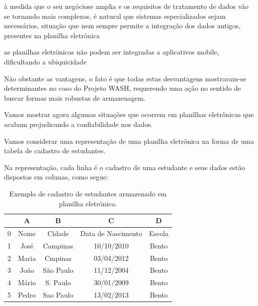 \documentclass[
12pt,		%
openright,	%
twoside,  %
a4paper,			%
chapter=TITLE,		%
english,			%
french,				%
spanish,			%
brazil				%
]{USPSC-classe/USPSC_RedarTex}
\begin{document}
\begin{alineas}
\item \`a medida que o seu \textquotedbl neg\'ocio\textquotedbl  se amplia e os requisitos de tratamento de dados v\~ao se tornando mais complexos, \'e natural que sistemas especializados sejam necess\'arios, situa\c{c}\~ao que nem sempre permite a integra\c{c}\~ao dos dados antigos, presentes na planilha eletr\^onica
\item as planilhas eletr\^onicas n\~ao podem ser integradas a aplicativos mobile, dificultando a ubiquicidade
\end{alineas}

N\~ao obstante as vantagens, o fato \'e que todas estas desvantagens mostraram-se determinantes no caso do Projeto WASH, requerendo uma a\c{c}\~ao no sentido de buscar formas mais robustas de armazenagem.










Vamos mostrar agora algumas situa\c{c}\~oes que ocorrem em planilhas eletr\^onicas que acabam prejudicando a confiabilidade nos dados.










Vamos considerar uma representa\c{c}\~ao de uma planilha eletr\^onica na forma de uma tabela de cadastro de estudantes.










Na representa\c{c}\~ao, cada linha \'e o cadastro de uma estudante e seus dados est\~ao dispostos em colunas, como segue:














\begin{table}[htb]
\tiny
\caption{\label{bb41d21eda68eb2f2098ab6a40e472b036dd488c}Exemplo de cadastro de estudantes armazenado em planilha eletr\^onica.}

\centering
\begin{tabular}{|c|c|c|c|c|}
\hline
  &  A  &  B  &  C  &  D  \\
\hline
0 & Nome  &  Cidade  &  Data de Nascimento  &  Escola \\
1 & Jos\'e  &  Campinas  &  10/10/2010  &  Bento \\
2 & Maria  &  Cmpinas  &  03/04/2012  &  Bento \\
3 & Jo\~ao  &  S\~ao Paulo  &  11/12/2004  &  Bento \\
4 & M\'ario  &  S. Paulo  &  30/01/2009  &  Bento \\
5 & Pedro  &  Sao Paulo  &  13/02/2013  &  Bento \\
\hline
\end{tabular}
\end{table}
\end{document}
